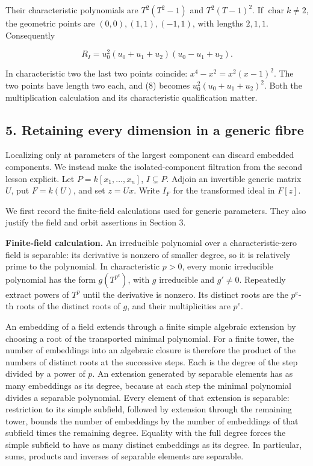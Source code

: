 \documentclass[
]{article}
\begin{document}
Their characteristic polynomials are \(T^2(T^2-1)\) and \(T^2(T-1)^2\).
If \(\operatorname{char}k\ne2\), the geometric points are
\((0,0),(1,1),(-1,1)\), with lengths \(2,1,1\). Consequently

\[
R_I=u_0^2(u_0+u_1+u_2)(u_0-u_1+u_2).
\tag{8}
\]

In characteristic two the last two points coincide:
\(x^4-x^2=x^2(x-1)^2\). The two points have length two each, and (8)
becomes \(u_0^2(u_0+u_1+u_2)^2\). Both the multiplication calculation
and its characteristic qualification matter.

\subsection{5. Retaining every dimension in a generic
fibre}\label{retaining-every-dimension-in-a-generic-fibre}

Localizing only at parameters of the largest component can discard
embedded components. We instead make the isolated-component filtration
from the second lesson explicit. Let \(P=k[x_1,\ldots,x_n]\),
\(I\subsetneq P\). Adjoin an invertible generic matrix \(U\), put
\(F=k(U)\), and set \(z=Ux\). Write \(I_F\) for the transformed ideal in
\(F[z]\).

We first record the finite-field calculations used for generic
parameters. They also justify the field and orbit assertions in Section
3.

\textbf{Finite-field calculation.} An irreducible polynomial over a
characteristic-zero field is separable: its derivative is nonzero of
smaller degree, so it is relatively prime to the polynomial. In
characteristic \(p>0\), every monic irreducible polynomial has the form
\(g(T^{p^e})\), with \(g\) irreducible and \(g'\ne0\). Repeatedly
extract powers of \(T^p\) until the derivative is nonzero. Its distinct
roots are the \(p^e\)-th roots of the distinct roots of \(g\), and their
multiplicities are \(p^e\).

An embedding of a field extends through a finite simple algebraic
extension by choosing a root of the transported minimal polynomial. For
a finite tower, the number of embeddings into an algebraic closure is
therefore the product of the numbers of distinct roots at the successive
steps. Each is the degree of the step divided by a power of \(p\). An
extension generated by separable elements has as many embeddings as its
degree, because at each step the minimal polynomial divides a separable
polynomial. Every element of that extension is separable: restriction to
its simple subfield, followed by extension through the remaining tower,
bounds the number of embeddings by the number of embeddings of that
subfield times the remaining degree. Equality with the full degree
forces the simple subfield to have as many distinct embeddings as its
degree. In particular, sums, products and inverses of separable elements
are separable.
\end{document}
